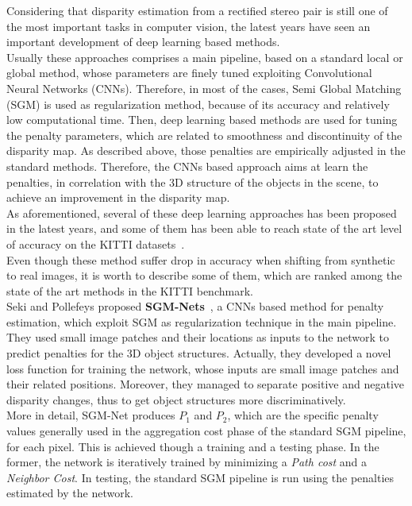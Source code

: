 Considering that disparity estimation from a rectified stereo pair is still one of the most important tasks in computer vision, the latest years have seen an important development of deep learning based methods. \\
Usually these approaches comprises a main pipeline, based on a standard local or global method, whose parameters are finely tuned exploiting Convolutional Neural Networks (CNNs). 
Therefore, in most of the cases, Semi Global Matching (SGM) is used as regularization method, because of its accuracy and relatively low computational time. 
Then, deep learning based methods are used for tuning the penalty parameters, which are related to smoothness and discontinuity of the disparity map. 
As described above, those penalties are empirically adjusted in the standard methods. 
Therefore, the CNNs based approach aims at learn the penalties, in correlation with the 3D structure of the objects in the scene, to achieve an improvement in the disparity map. \\
As aforementioned, several of these deep learning approaches has been proposed in the latest years, and some of them has been able to reach state of the art level of accuracy on the KITTI datasets~\cite{menze2015object}.\\
Even though these method suffer drop in accuracy when shifting from synthetic to real images, it is worth to describe some of them, which are ranked among the state of the art methods in the KITTI benchmark. \\
Seki and Pollefeys proposed \textbf{SGM-Nets}~\cite{Seki2017}, a CNNs based method for penalty estimation, which exploit SGM as regularization technique in the main pipeline. 
They used small image patches and their locations as inputs to the network to predict penalties for the 3D object structures. 
Actually, they developed a novel loss function for training the network, whose inputs are small image patches and their related positions. 
Moreover, they managed to separate positive and negative disparity changes, thus to get object structures more discriminatively.\\
More in detail, SGM-Net produces $P_1$ and $P_2$, which are the specific penalty values generally used in the aggregation cost phase of the standard SGM pipeline, for each pixel. 
This is achieved though a training and a testing phase. 
In the former, the network is iteratively trained by minimizing a \textit{Path cost} and a \textit{Neighbor Cost}. 
In testing, the standard SGM pipeline is run using the penalties estimated by the network. 
